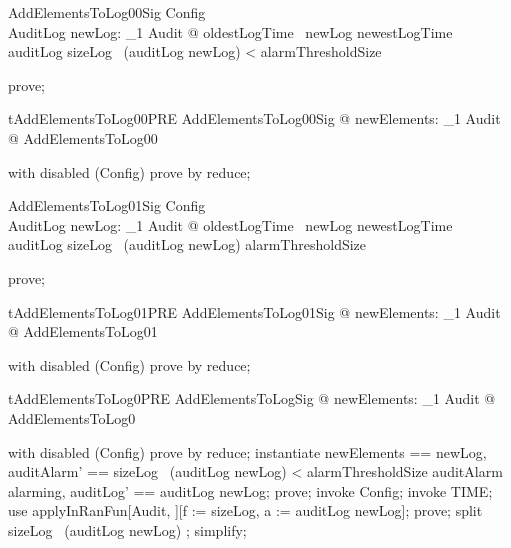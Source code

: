 \begin{schema}{AddElementsToLog00Sig}
  Config\\
  AuditLog
\where
  \exists  newLog: \finset _1{} Audit @
      oldestLogTime~ newLog \geq  newestLogTime~ auditLog \land
      sizeLog~ (auditLog \cup  newLog) < alarmThresholdSize
\end{schema}

\begin{zproof}
prove;
\end{zproof}

\begin{theorem}{tAddElementsToLog00PRE}
\forall  AddElementsToLog00Sig @ \exists  newElements: \finset _1{} Audit @ \pre  AddElementsToLog00
\end{theorem}

\begin{zproof}
with disabled (Config) prove by reduce;
\end{zproof}

\begin{schema}{AddElementsToLog01Sig}
  Config\\
  AuditLog
\where
  \exists  newLog: \finset _1{} Audit @ oldestLogTime~ newLog \geq  newestLogTime~ auditLog \land  sizeLog~ (auditLog \cup  newLog) \geq  alarmThresholdSize
\end{schema}

\begin{zproof}
prove;
\end{zproof}

\begin{theorem}{tAddElementsToLog01PRE}
\forall  AddElementsToLog01Sig @ \exists  newElements: \finset _1{} Audit @ \pre  AddElementsToLog01
\end{theorem}

\begin{zproof}
with disabled (Config) prove by reduce;
\end{zproof}

\begin{theorem}{tAddElementsToLog0PRE}
\forall  AddElementsToLogSig @ \exists  newElements: \finset _1{} Audit @ \pre  AddElementsToLog0
\end{theorem}

\begin{zproof}
with disabled (Config) prove by reduce;
instantiate newElements == newLog, auditAlarm' == \IF  sizeLog~ (auditLog \cup  newLog) < alarmThresholdSize \THEN  auditAlarm \ELSE  alarming, auditLog' == auditLog \cup  newLog;
prove;
invoke Config;
invoke TIME;
use applyInRanFun[\finset  Audit, \nat ][f := sizeLog, a := auditLog \cup  newLog];
prove;
split sizeLog~ (auditLog \cup  newLog) ;
simplify;
\end{zproof}


